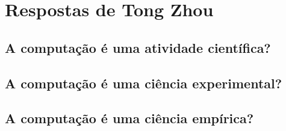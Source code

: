 \section{Respostas de Tong Zhou}

\subsection{A computação é uma atividade científica?}

\subsection{A computação é uma ciência experimental?}

\subsection{A computação é uma ciência empírica?}